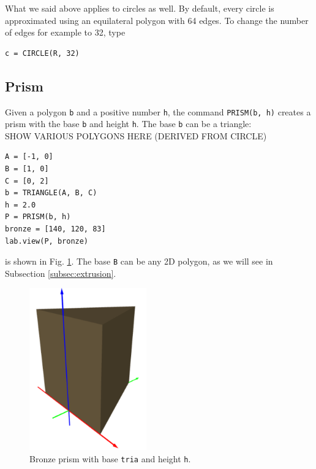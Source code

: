 What we said above applies to circles as well. By default, every circle 
is approximated using an equilateral polygon 
with 64 edges. To change the number of edges for example to 32, type\\

\begin{bbox}
\begin{verbatim}
c = CIRCLE(R, 32)
\end{verbatim}
\end{bbox}
\vspace{6mm}
\noindent

\subsection{Prism}\label{subsec:prism}

Given a polygon {\tt b} and a positive number {\tt h}, the command 
{\tt PRISM(b, h)} creates a prism with the base {\tt b} and height {\tt h}. 
The base {\tt b} can be a triangle:\\

SHOW VARIOUS POLYGONS HERE (DERIVED FROM CIRCLE)\\

\begin{bbox}
\begin{verbatim}
A = [-1, 0] 
B = [1, 0] 
C = [0, 2] 
b = TRIANGLE(A, B, C)
h = 2.0
P = PRISM(b, h)
bronze = [140, 120, 83]
lab.view(P, bronze)
\end{verbatim}
\end{bbox}
\vspace{6mm}

\noindent
is shown in Fig. \ref{fig:prism}. The base {\tt B} can be any 2D polygon,
as we will see in Subsection \ref{subsec:extrusion}.\\

\begin{figure}[!ht]
\begin{center}
\includegraphics[width=0.45\textwidth]{img/prism-0.png}
\end{center}
\vspace{-4mm}
\caption{Bronze prism with base {\tt tria} and height {\tt h}.}
\label{fig:prism}
\end{figure}

